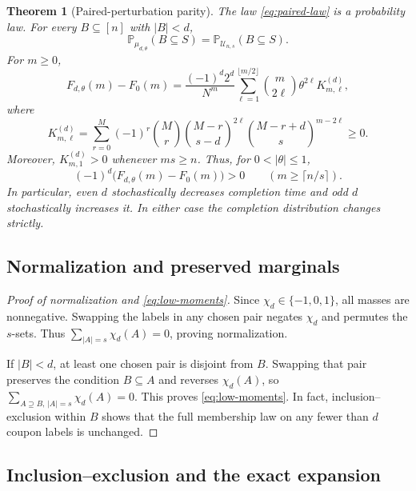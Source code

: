 \documentclass[11pt]{article}
\numberwithin{equation}{section}
\newtheorem{theorem}{Theorem}[section]
\theoremstyle{remark}
\newcommand{\Pp}{\mathbb P}
\newcommand{\1}{\mathbf 1}
\newcommand{\U}{\mathcal U}
\begin{document}
\begin{theorem}[Paired-perturbation parity]\label{thm:parity}
The law \eqref{eq:paired-law} is a probability law. For every $B\subseteq[n]$ with $|B|<d$,
\begin{equation}\label{eq:low-moments}
 \Pp_{\mu_{d,\theta}}(B\subseteq S)
 =\Pp_{\U_{n,s}}(B\subseteq S).
\end{equation}
For $m\geq0$,
\begin{equation}\label{eq:parity-expansion}
 F_{d,\theta}(m)-F_0(m)
 =\frac{(-1)^d2^d}{N^m}
   \sum_{\ell=1}^{\lfloor m/2\rfloor}
     \binom m{2\ell}\theta^{2\ell}K^{(d)}_{m,\ell},
\end{equation}
where
\begin{equation}\label{eq:K}
 K^{(d)}_{m,\ell}
 =\sum_{r=0}^{M}(-1)^r\binom Mr
   \binom{M-r}{s-d}^{2\ell}
   \binom{M-r+d}{s}^{m-2\ell}
 \geq0.
\end{equation}
Moreover, $K^{(d)}_{m,1}>0$ whenever $ms\geq n$. Thus, for $0<|\theta|\leq1$,
\begin{equation}\label{eq:strict-parity}
 (-1)^d\bigl(F_{d,\theta}(m)-F_0(m)\bigr)>0
 \qquad(m\geq\lceil n/s\rceil).
\end{equation}
In particular, even $d$ stochastically decreases completion time and odd $d$ stochastically increases it. In either case the completion distribution changes strictly.
\end{theorem}

\subsection{Normalization and preserved marginals}

\begin{proof}[Proof of normalization and \eqref{eq:low-moments}]
Since $\chi_d\in\{-1,0,1\}$, all masses are nonnegative. Swapping the labels in any chosen pair negates $\chi_d$ and permutes the $s$-sets. Thus $\sum_{|A|=s}\chi_d(A)=0$, proving normalization.

If $|B|<d$, at least one chosen pair is disjoint from $B$. Swapping that pair preserves the condition $B\subseteq A$ and reverses $\chi_d(A)$, so
$\sum_{A\supseteq B,\,|A|=s}\chi_d(A)=0$. This proves \eqref{eq:low-moments}. In fact, inclusion--exclusion within $B$ shows that the full membership law on any fewer than $d$ coupon labels is unchanged.
\end{proof}

\subsection{Inclusion--exclusion and the exact expansion}
\end{document}
